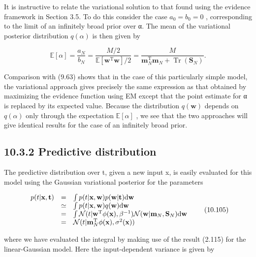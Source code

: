 \documentclass[
  10
]{article}
\begin{document}
It is instructive to relate the variational solution to that found using
the evidence framework in Section 3.5. To do this consider the case
\(a _ { 0 } = b _ { 0 } = 0\) , corresponding to the limit of an
infinitely broad prior over α. The mean of the variational posterior
distribution \(q ( \alpha )\) is then given by

\[
\mathbb {E} [ \alpha ] = \frac {a _ {N}}{b _ {N}} = \frac {M / 2}{\mathbb {E} [ \mathbf {w} ^ {\mathrm{T}} \mathbf {w} ] / 2} = \frac {M}{\mathbf {m} _ {N} ^ {\mathrm{T}} \mathbf {m} _ {N} + \operatorname{Tr} (\mathbf {S} _ {N})}.\tag{10.104}
\]

Comparison with (9.63) shows that in the case of this particularly
simple model, the variational approach gives precisely the same
expression as that obtained by maximizing the evidence function using EM
except that the point estimate for α is replaced by its expected value.
Because the distribution \(q ( \mathbf { w } )\) depends on
\(q ( \alpha )\) only through the expectation
\(\mathbb { E } [ \alpha ]\) , we see that the two approaches will give
identical results for the case of an infinitely broad prior.

\subsection{10.3.2 Predictive
distribution}\label{predictive-distribution}

The predictive distribution over t, given a new input x, is easily
evaluated for this model using the Gaussian variational posterior for
the parameters

\[
\begin{array}{r c l} p (t | \mathbf {x}, \mathbf {t}) & = & \int p (t | \mathbf {x}, \mathbf {w}) p (\mathbf {w} | \mathbf {t})   \mathrm{d} \mathbf {w} \\ & \simeq & \int p (t | \mathbf {x}, \mathbf {w}) q (\mathbf {w})   \mathrm{d} \mathbf {w} \\ & = & \int \mathcal {N} (t | \mathbf {w} ^ {\mathrm{T}} \phi (\mathbf {x}), \beta^ {- 1}) \mathcal {N} (\mathbf {w} | \mathbf {m} _ {N}, \mathbf {S} _ {N})   \mathrm{d} \mathbf {w} \\ & = & \mathcal {N} (t | \mathbf {m} _ {N} ^ {\mathrm{T}} \phi (\mathbf {x}), \sigma^ {2} (\mathbf {x})) \end{array}\tag{10.105}
\]

where we have evaluated the integral by making use of the result (2.115)
for the linear-Gaussian model. Here the input-dependent variance is
given by
\end{document}
